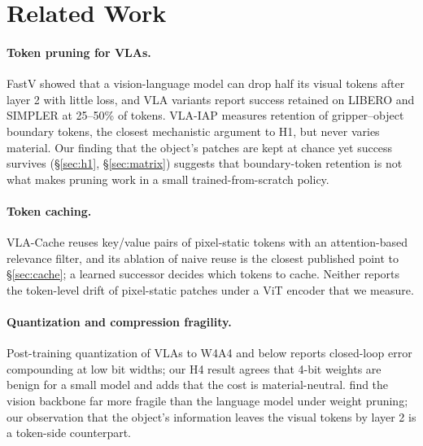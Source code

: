 \documentclass[11pt]{article}
\begin{document}
\section{Related Work}
\label{sec:related}

\paragraph{Token pruning for VLAs.} FastV \citep{chen2024fastv} showed that a vision-language model can drop half its visual tokens after layer 2 with little loss, and VLA variants \citep{liu2025vlapruner,cheng2026vlaiap,yang2025efficientvla} report success retained on LIBERO and SIMPLER at 25--50\% of tokens. VLA-IAP \citep{cheng2026vlaiap} measures retention of gripper--object boundary tokens, the closest mechanistic argument to H1, but never varies material. Our finding that the object's patches are kept at chance yet success survives (\S\ref{sec:h1}, \S\ref{sec:matrix}) suggests that boundary-token retention is not what makes pruning work in a small trained-from-scratch policy.

\paragraph{Token caching.} VLA-Cache \citep{xu2025vlacache} reuses key/value pairs of pixel-static tokens with an attention-based relevance filter, and its ablation of naive reuse is the closest published point to \S\ref{sec:cache}; a learned successor \citep{wei2026learnedcache} decides which tokens to cache. Neither reports the token-level drift of pixel-static patches under a ViT encoder that we measure.

\paragraph{Quantization and compression fragility.} Post-training quantization of VLAs to W4A4 and below \citep{zhang2026quantvla,wang2026holoq,akbari2026actquant,yan2026hbvla} reports closed-loop error compounding at low bit widths; our H4 result agrees that 4-bit weights are benign for a small model and adds that the cost is material-neutral. \citet{jabbour2025scissors} find the vision backbone far more fragile than the language model under weight pruning; our observation that the object's information leaves the visual tokens by layer 2 is a token-side counterpart.
\end{document}

